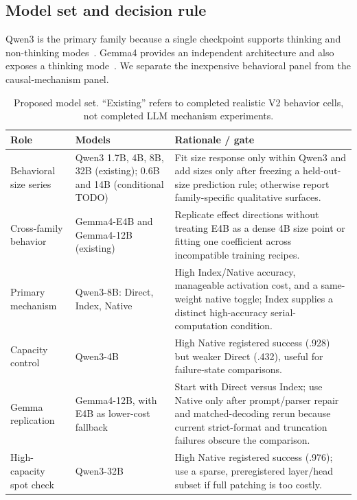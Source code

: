 \documentclass[11pt]{article}
\begin{document}
\subsection{Model set and decision rule}

Qwen3 is the primary family because a single checkpoint supports thinking and non-thinking modes~\citep{yang2025qwen3}. Gemma4 provides an independent architecture and also exposes a thinking mode~\citep{gemmateam2026gemma4}. We separate the inexpensive behavioral panel from the causal-mechanism panel.

\begin{table}[H]
\centering
\caption{Proposed model set. ``Existing'' refers to completed realistic V2 behavior cells, not completed LLM mechanism experiments.}
\label{tab:model-set}
\small
\begin{tabularx}{\textwidth}{@{}P{.22\textwidth}P{.22\textwidth}Y@{}}
\toprule
Role & Models & Rationale / gate \\
\midrule
Behavioral size series & Qwen3 1.7B, 4B, 8B, 32B (existing); 0.6B and 14B (conditional TODO) & Fit size response only within Qwen3 and add sizes only after freezing a held-out-size prediction rule; otherwise report family-specific qualitative surfaces. \\
Cross-family behavior & Gemma4-E4B and Gemma4-12B (existing) & Replicate effect directions without treating E4B as a dense 4B size point or fitting one coefficient across incompatible training recipes. \\
Primary mechanism & Qwen3-8B: Direct, Index, Native & High Index/Native accuracy, manageable activation cost, and a same-weight native toggle; Index supplies a distinct high-accuracy serial-computation condition. \\
Capacity control & Qwen3-4B & High Native registered success (.928) but weaker Direct (.432), useful for failure-state comparisons. \\
Gemma replication & Gemma4-12B, with E4B as lower-cost fallback & Start with Direct versus Index; use Native only after prompt/parser repair and matched-decoding rerun because current strict-format and truncation failures obscure the comparison. \\
High-capacity spot check & Qwen3-32B & High Native registered success (.976); use a sparse, preregistered layer/head subset if full patching is too costly. \\
\bottomrule
\end{tabularx}
\end{table}
\end{document}
